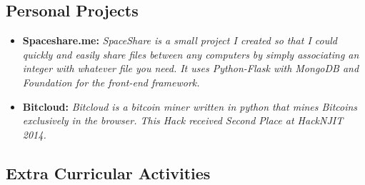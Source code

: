 \documentclass[12pt,a4paper,sans]{moderncv}        %
\begin{document}
\vspace{10pt}

\subsection{Personal Projects}

\vspace{5pt}

\begin{itemize}

\item{\textbf{Spaceshare.me:}\textit{ SpaceShare is a small project I created so that I could quickly and easily share files between any computers by simply associating an integer with whatever file you need. It uses Python-Flask with MongoDB and Foundation for the front-end framework.}}

\vspace{5pt}

\item{\textbf{Bitcloud:}\textit{ Bitcloud is a bitcoin miner written in python that mines Bitcoins exclusively in the browser. This Hack received Second Place at HackNJIT 2014.}}

\vspace{5pt}

\end{itemize}

\subsection{Extra Curricular Activities}

\vspace{5pt}
\end{document}
